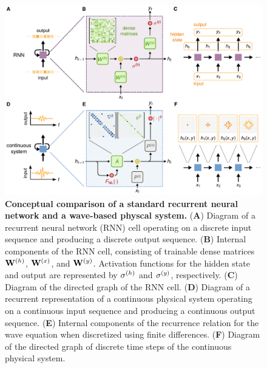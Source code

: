 \begin{figure}
  \centering
  \includegraphics[width=\textwidth]{figures/insitu_RNN}
  \caption{
  \textbf{Conceptual comparison of a standard recurrent neural network and a wave-based physcal system.}
  (\textbf{A})
  Diagram of a recurrent neural network (RNN) cell operating on a discrete input sequence and producing a discrete output sequence. 
  (\textbf{B})
  Internal components of the RNN cell, consisting of trainable dense matrices $\mathbf{W}^{(h)}$, $\mathbf{W}^{(x)}$, and $\mathbf{W}^{(y)}$. 
  Activation functions for the hidden state and output are represented by $\sigma^{(h)}$ and $\sigma^{(y)}$, respectively. 
  (\textbf{C}) 
  Diagram of the directed graph of the RNN cell. 
  (\textbf{D}) 
  Diagram of a recurrent representation of a continuous physical system operating on a continuous input sequence and producing a continuous output sequence. 
  (\textbf{E}) 
  Internal components of the recurrence relation for the wave equation when discretized using finite differences. 
  (\textbf{F}) 
  Diagram of the directed graph of discrete time steps of the continuous physical system.}
  \label{fig:RNN}
\end{figure}

